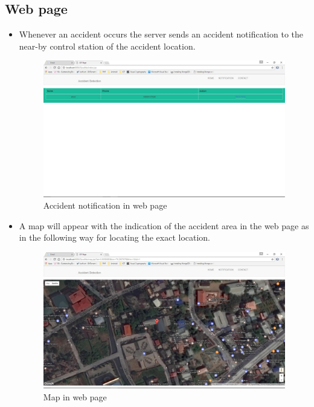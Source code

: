 \documentclass[12pt,a4paper,oneside]{report}
\begin{document}
{\subsection{Web page}
\begin{itemize}

\item \par Whenever an accident occurs the server sends an accident notification to the near-by control station of the accident location.
\begin{figure}[h]
\begin{center}
\includegraphics[scale=.4]{Notification.jpg}
\caption{Accident notification in web page}
\label{Accident notification in web page}
\end{center}
\end{figure}
\newpage
\item \par A map will appear with the indication of the accident area in the web page as in the following way for locating the exact location.

\begin{figure}[h]
\begin{center}
\includegraphics[scale=.4]{maps.jpg}
\caption{Map in web page}
\label{Map in web page }
\end{center}
\end{figure}
\end{itemize}
}
\end{document}
